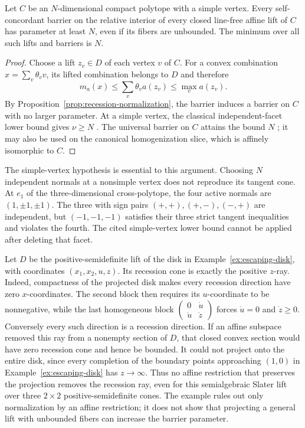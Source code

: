 \begin{corollary}
\label{cor:polytope-lift-barrier}
Let $C$ be an $N$-dimensional compact polytope with a simple vertex.
Every self-concordant barrier on the relative interior of every closed
line-free affine lift of $C$ has parameter at least $N$, even if its
fibers are unbounded. The minimum over all such lifts and barriers is $N$.
\end{corollary}
\begin{proof}
Choose a lift $z_v\in D$ of each vertex $v$ of $C$. For a convex
combination $x=\sum_v\theta_vv$, its lifted combination belongs to $D$
and therefore
\[
 m_a(x)\leq\sum_v\theta_va(z_v)\leq\max_v a(z_v).
\]
By Proposition~\ref{prop:recession-normalization}, the barrier induces a
barrier on $C$ with no larger parameter. At a simple vertex, the
classical independent-facet lower bound gives $\nu\geq N$
\cite[Proposition~2.3.6]{NN1994}. The universal barrier on $C$ attains
the bound $N$ \cite[Theorem~2]{LeeYue2021}; it may also be used on
the canonical homogenization slice, which is affinely isomorphic to $C$.
\end{proof}

The simple-vertex hypothesis is essential to this argument. Choosing
$N$ independent normals at a nonsimple vertex does not reproduce its
tangent cone. At $e_1$ of the three-dimensional cross-polytope, the four
active normals are $(1,\pm1,\pm1)$. The three with sign pairs
$(+,+),(+,-),(-,+)$ are independent, but $(-1,-1,-1)$ satisfies their
three strict tangent inequalities and violates the fourth. The cited
simple-vertex lower bound cannot be applied after deleting that facet.

\begin{example}
\label{ex:no-affine-normalization}
Let $D$ be the positive-semidefinite lift of the disk in
Example~\ref{ex:escaping-disk}, with coordinates $(x_1,x_2,u,z)$.
Its recession cone is exactly the positive $z$-ray. Indeed, compactness
of the projected disk makes every recession direction have zero
$x$-coordinates. The second block then requires its $u$-coordinate
to be nonnegative, while the last homogeneous block
$\left(\begin{smallmatrix}0&\dot u\\\dot u&\dot z\end{smallmatrix}\right)$
forces $\dot u=0$ and $\dot z\geq0$. Conversely every such direction
is a recession direction. If an affine subspace removed this ray from
a nonempty section of $D$, that closed convex section would have zero
recession cone and hence be bounded. It could not project onto the
entire disk, since every completion of the boundary points approaching
$(1,0)$ in Example~\ref{ex:escaping-disk} has $z\to\infty$.
Thus no affine restriction that preserves the projection removes the
recession ray, even for this semialgebraic Slater lift over three
$2\times2$ positive-semidefinite cones. The example rules out only
normalization by an affine restriction; it does not show that projecting
a general lift with unbounded fibers can increase the barrier parameter.
\end{example}


